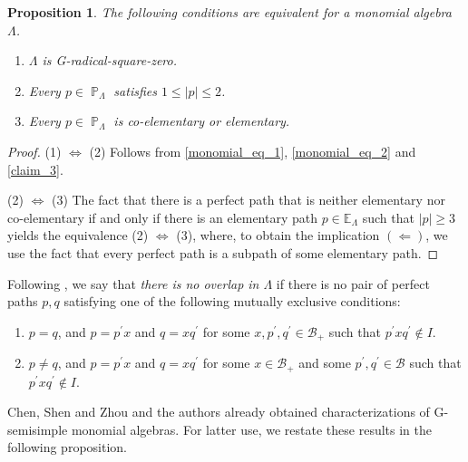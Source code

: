 \documentclass[12pt]{amsart}
\numberwithin{equation}{subsection}
\theoremstyle{plain}
\newtheorem{proposition}[theorem]{Proposition}
\theoremstyle{definition}
\renewcommand{\P}{\operatorname{\mathbb{P}}\nolimits}
\renewcommand{\L}{\Lambda}
\newcommand{\B}{\mathcal{B}}
\newcommand{\E}{\mathbb{E}}
\begin{document}
\begin{proposition}\label{claim_27}
The following conditions are equivalent for a monomial algebra $\L$.
\begin{enumerate}
\item $\L$ is G-radical-square-zero.
\item Every $p\in\P_\L$ satisfies $1 \leq |p| \leq 2$. 
\item Every $p\in\P_\L$ is co-elementary or elementary.
\end{enumerate}
\end{proposition}
\begin{proof} 
(1) $\Leftrightarrow$ (2)
Follows from \eqref{monomial_eq_1}, \eqref{monomial_eq_2} and \cref{claim_3}.




(2) $\Leftrightarrow$ (3)
The fact that there is a perfect path that is neither elementary nor co-elementary if and only if there is an elementary path $p\in\E_\L$ such that $|p|\geq 3$  yields the equivalence (2) $\Leftrightarrow$ (3), where, to obtain the implication $(\Leftarrow)$, we use the fact that every perfect path is a subpath of some elementary path.
\end{proof}








Following \cite[p.1130]{Chen-Shen-Zhou_2018}, we say that {\it there is no overlap in $\L$} if there is no pair of  perfect paths $p, q$ satisfying one of the following mutually exclusive conditions:
\begin{enumerate}
    \item [(O1)] $p=q$, and $p=p^\prime x$ and $q=x q^\prime$ for some $x, p^\prime, q^\prime \in \B_+$ such that $p^\prime x q^\prime \not\in I$.
    \item [(O2)] $p\not=q$, and $p=p^\prime x$ and $q=x q^\prime$ for some $x \in \B_+$ and some $p^\prime, q^\prime \in \B$ such that  $p^\prime x q^\prime\not\in I$.
\end{enumerate}
Chen, Shen and Zhou \cite[Proposition 5.9]{Chen-Shen-Zhou_2018} and the authors \cite[Proposition 4.4]{Honma-Usui_2025} already obtained characterizations of G-semisimple monomial algebras.
For latter use, we restate these results in the following proposition.
\end{document}
